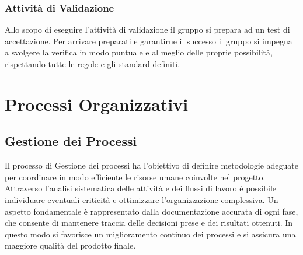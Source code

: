 \documentclass[a4paper,12pt]{article}
\begin{document}
        \subsubsection{Attività di Validazione}
            Allo scopo di eseguire l'attività di validazione il gruppo si prepara ad un test di accettazione. Per arrivare preparati e garantirne il successo il gruppo si impegna a svolgere la verifica in modo puntuale e al meglio delle proprie possibilità, rispettando tutte le regole e gli standard definiti.

\newpage

\section{Processi Organizzativi}
    \subsection{Gestione dei Processi}
        Il processo di Gestione dei processi ha l'obiettivo di definire metodologie adeguate per coordinare in modo efficiente le risorse umane coinvolte nel progetto.
        Attraverso l'analisi sistematica delle attività e dei flussi di lavoro è possibile individuare eventuali criticità e ottimizzare l'organizzazione complessiva.
        Un aspetto fondamentale è rappresentato dalla documentazione accurata di ogni fase, che consente di mantenere traccia delle decisioni prese e dei risultati ottenuti.
        In questo modo si favorisce un miglioramento continuo dei processi e si assicura una maggiore qualità del prodotto finale.
\end{document}
